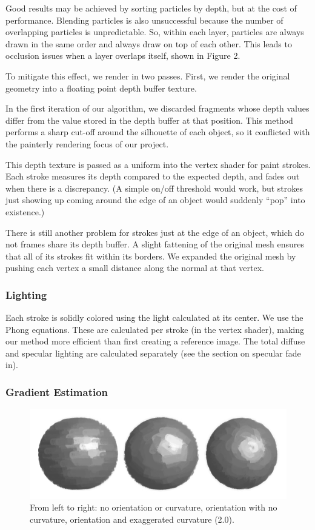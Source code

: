 \documentclass[conference]{acmsiggraph}
\begin{document}
Good results may be achieved by sorting particles by depth, but at the cost of
performance. Blending particles is also unsuccessful because the number of
overlapping particles is unpredictable. So, within each layer, particles are
always drawn in the same order and always draw on top of each other. This leads
to occlusion issues when a layer overlaps itself, shown in Figure 2.

To mitigate this effect, we render in two passes. First, we render the original
geometry into a floating point depth buffer texture.

In the first iteration of our algorithm, we discarded fragments whose depth
values differ from the value stored in the depth buffer at that position. This
method performs a sharp cut-off around the silhouette of each object, so it
conflicted with the painterly rendering focus of our project.

This depth texture is passed as a uniform into the vertex shader for paint
strokes. Each stroke measures its depth compared to the expected depth, and
fades out when there is a discrepancy. (A simple on/off threshold would work,
but strokes just showing up coming around the edge of an object would suddenly
``pop'' into existence.)

There is still another problem for strokes just at the edge of an object, which
do not frames share its depth buffer. A slight fattening of the original mesh
ensures that all of its strokes fit within its borders. We expanded the
original mesh by pushing each vertex a small distance along the normal at that
vertex.

\subsubsection{Lighting}

Each stroke is solidly colored using the light calculated at its center. We use
the Phong equations. These are calculated per stroke (in the vertex shader),
making our method more efficient than first creating a reference image. The
total diffuse and specular lighting are calculated separately (see the section
on specular fade in).


\subsubsection{Gradient Estimation}

\begin{figure}[ht]
  \centering
  \includegraphics[width=6.0in]{images/sphere_rotation_curve}
  \caption{From left to right: no orientation or curvature, orientation with
           no curvature, orientation and exaggerated curvature (2.0).}
\end{figure}
\end{document}
